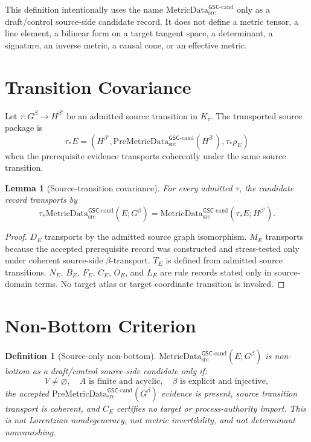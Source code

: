 \documentclass[11pt]{article}
\newcommand{\PreMetricData}{\mathrm{PreMetricData}_{\mathrm{src}}^{\mathsf{GSC}\mbox{-}\mathrm{cand}}}
\newcommand{\MetricData}{\mathrm{MetricData}_{\mathrm{src}}^{\mathsf{GSC}\mbox{-}\mathrm{cand}}}
\newcommand{\Gbeta}{G^\beta}
\newtheorem{definition}{Definition}
\newtheorem{lemma}{Lemma}
\begin{document}
This definition intentionally uses the name \(\MetricData\) only as a
draft/control source-side candidate record. It does not define a metric tensor,
a line element, a bilinear form on a target tangent space, a determinant, a
signature, an inverse metric, a causal cone, or an effective metric.

\section{Transition Covariance}

Let \(\tau:\Gbeta\to H^{\beta'}\) be an admitted source transition in
\(K_\tau\). The transported source package is
\[
  \tau_\ast E = (H^{\beta'},\PreMetricData(H^{\beta'}),\tau_\ast\rho_E)
\]
when the prerequisite evidence transports coherently under the same source
transition.

\begin{lemma}[Source-transition covariance]
For every admitted \(\tau\), the candidate record transports by
\[
  \tau_\ast\MetricData(E;\Gbeta)
  =
  \MetricData(\tau_\ast E;H^{\beta'}).
\]
\end{lemma}

\begin{proof}
\(D_E\) transports by the admitted source graph isomorphism. \(M_E\)
transports because the accepted prerequisite record was constructed and
stress-tested only under coherent source-side \(\beta\)-transport. \(T_E\) is
defined from admitted source transitions. \(N_E\), \(B_E\), \(F_E\), \(C_E\),
\(O_E\), and \(L_E\) are rule records stated only in source-domain terms.
No target atlas or target coordinate transition is invoked.
\end{proof}

\section{Non-Bottom Criterion}

\begin{definition}[Source-only non-bottom]
\(\MetricData(E;\Gbeta)\) is non-bottom as a draft/control source-side
candidate only if:
\[
  V\ne\varnothing,\quad A\text{ is finite and acyclic},\quad
  \beta\text{ is explicit and injective},
\]
the accepted \(\PreMetricData(\Gbeta)\) evidence is present, source transition
transport is coherent, and \(C_E\) certifies no target or process-authority
import. This is not Lorentzian nondegeneracy, not metric invertibility, and
not determinant nonvanishing.
\end{definition}
\end{document}
